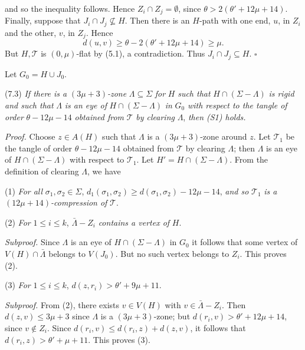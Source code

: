 \noindent and so the inequality follows. Hence $Z_i \cap Z_j = \emptyset$, since $\theta > 2(\theta' + 12\mu + 14)$. Finally, suppose that $J_i \cap J_j \not\subseteq H$. Then there is an $H$-path with one end, $u$, in $Z_i$ and the other, $v$, in $Z_j$. Hence
\begin{equation*}
d(u, v) \ge \theta - 2(\theta' + 12\mu + 14) \ge \mu.
\end{equation*}
But $H, \mathcal{T}$ is $(0, \mu)$-flat by (5.1), a contradiction. Thus $J_i \cap J_j \subseteq H$. $\square$

Let $G_0 = H \cup J_0$.

\stmt
(7.3) \textit{If there is a} $(3\mu + 3)$\textit{-zone} $\Lambda \subseteq \Sigma$ \textit{for} $H$ \textit{such that} $H \cap (\Sigma - \Lambda)$ \textit{is rigid and such that} $\Lambda$ \textit{is an eye of} $H \cap (\Sigma - \Lambda)$ \textit{in} $G_0$ \textit{with respect to the tangle of order} $\theta - 12\mu - 14$ \textit{obtained from} $\mathcal{T}$ \textit{by clearing} $\Lambda$, \textit{then (S1) holds.}

\textit{Proof.} Choose $z \in A(H)$ such that $\Lambda$ is a $(3\mu + 3)$-zone around $z$. Let $\mathcal{T}_1$ be the tangle of order $\theta - 12\mu - 14$ obtained from $\mathcal{T}$ by clearing $\Lambda$; then $\Lambda$ is an eye of $H \cap (\Sigma - \Lambda)$ with respect to $\mathcal{T}_1$. Let $H' = H \cap (\Sigma - \Lambda)$. From the definition of clearing $\Lambda$, we have

\hspace*{12pt}(1) \textit{For all} $\sigma_1, \sigma_2 \in \Sigma$, $d_1(\sigma_1, \sigma_2) \ge d(\sigma_1, \sigma_2) - 12\mu - 14$, \textit{and so} $\mathcal{T}_1$ \textit{is a} $(12\mu + 14)$\textit{-compression of} $\mathcal{T}$.

\hspace*{12pt}(2) \textit{For} $1 \le i \le k$, $\bar{\Lambda} - Z_i$ \textit{contains a vertex of} $H$.

\textit{Subproof.} Since $\Lambda$ is an eye of $H \cap (\Sigma - \Lambda)$ in $G_0$ it follows that some vertex of $V(H) \cap \bar{\Lambda}$ belongs to $V(J_0)$. But no such vertex belongs to $Z_i$. This proves (2).

\hspace*{12pt}(3) \textit{For} $1 \le i \le k$, $d(z, r_i) > \theta' + 9\mu + 11$.

\textit{Subproof.} From (2), there exists $v \in V(H)$ with $v \in \bar{\Lambda} - Z_i$. Then $d(z, v) \le 3\mu + 3$ since $\Lambda$ is a $(3\mu + 3)$-zone; but $d(r_i, v) > \theta' + 12\mu + 14$, since $v \notin Z_i$. Since $d(r_i, v) \le d(r_i, z) + d(z, v)$, it follows that $d(r_i, z) > \theta' + \mu + 11$. This proves (3).

